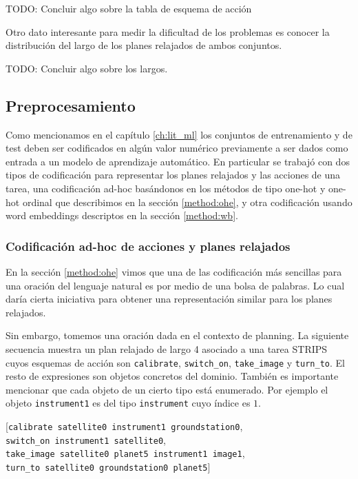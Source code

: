 TODO: Concluir algo sobre la tabla de esquema de acción

Otro dato interesante para medir la dificultad de los problemas es conocer la distribución del largo de los planes relajados de ambos conjuntos.

TODO: Concluir algo sobre los largos.

\subsection{Preprocesamiento}
\label{method:preprocessing}

Como mencionamos en el capítulo \ref{ch:lit_ml} los conjuntos de entrenamiento y de test deben ser codificados en algún valor numérico previamente a ser dados como entrada a un modelo de aprendizaje automático. En particular se trabajó con dos tipos de codificación para representar los planes relajados y las acciones de una tarea, una codificación ad-hoc basándonos en los métodos de tipo one-hot y one-hot ordinal que describimos en la sección \ref{method:ohe}, y otra codificación usando word embeddings descriptos en la sección \ref{method:wb}.

\subsubsection{Codificación ad-hoc de acciones y planes relajados}
\label{method:vectorization}

En la sección \ref{method:ohe} vimos que una de las codificación más sencillas para una oración del lenguaje natural es por medio de una bolsa de palabras. Lo cual daría cierta iniciativa para obtener una representación similar para los planes relajados.

Sin embargo, tomemos una oración dada en el contexto de planning. La siguiente secuencia muestra un plan relajado de largo 4 asociado a una tarea STRIPS cuyos esquemas de acción son \verb|calibrate|, \verb|switch_on|, \verb|take_image| y \verb|turn_to|. El resto de
expresiones son objetos concretos del dominio. También es importante mencionar
que cada objeto de un cierto tipo está enumerado. Por ejemplo el objeto
\verb|instrument1| es del tipo \verb|instrument| cuyo índice es $1$. 

\begin{center}
    [\verb|calibrate satellite0 instrument1 groundstation0|, \\
    \verb|switch_on instrument1 satellite0|, \\
    \verb|take_image satellite0 planet5 instrument1 image1|, \\
    \verb|turn_to satellite0 groundstation0 planet5|] \\
\end{center}

